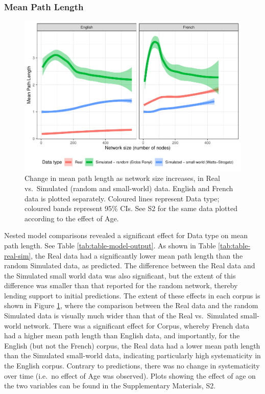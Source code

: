 \documentclass[
  man]{apa6}
\begin{document}
\subsubsection{Mean Path Length}\label{mean-path-length}

\begin{figure}
\centering
\includegraphics{NetworkGraphs_R2_files/figure-latex/Figure-path-length-1.pdf}
\caption{\label{fig:Figure-path-length}Change in mean path length as network size increases, in Real vs.~Simulated (random and small-world) data. English and French data is plotted separately. Coloured lines represent Data type; coloured bands represent 95\% CIs. See S2 for the same data plotted according to the effect of Age.}
\end{figure}

Nested model comparisons revealed a significant effect for Data type on mean path length. See Table \ref{tab:table-model-output}. As shown in Table \ref{tab:table-real-sim}, the Real data had a significantly lower mean path length than the random Simulated data, as predicted. The difference between the Real data and the Simulated small world data was also significant, but the extent of this difference was smaller than that reported for the random network, thereby lending support to initial predictions. The extent of these effects in each corpus is shown in Figure \ref{fig:Figure-path-length}, where the comparison between the Real data and the random Simulated data is visually much wider than that of the Real vs.~Simulated small-world network. There was a significant effect for Corpus, whereby French data had a higher mean path length than English data, and importantly, for the English (but not the French) corpus, the Real data had a lower mean path length than the Simulated small-world data, indicating particularly high systematicity in the English corpus. Contrary to predictions, there was no change in systematicity over time (i.e.~no effect of Age was observed). Plots showing the effect of age on the two variables can be found in the Supplementary Materials, S2.
\end{document}
